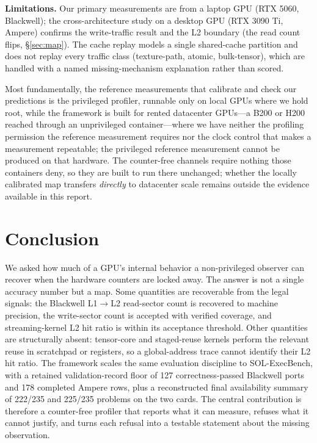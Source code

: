 \documentclass[conference]{IEEEtran}
\begin{document}
\textbf{Limitations.} Our primary measurements are from a laptop GPU (RTX 5060,
Blackwell); the cross-architecture study on a desktop GPU (RTX 3090 Ti, Ampere)
confirms the write-traffic result and the L2 boundary (the read
count flips, \S\ref{sec:map}). The cache replay models a single shared-cache partition and
does not replay every traffic class (texture-path, atomic, bulk-tensor), which are
handled with a named missing-mechanism explanation rather than scored.

Most fundamentally, the reference measurements that calibrate and check our predictions
is the privileged profiler, runnable only on local GPUs where we hold root,
while the framework is built for rented datacenter GPUs---a B200 or H200
reached through an unprivileged container---where we have neither the profiling
permission the reference measurement requires nor the clock control that makes a
measurement repeatable; the privileged reference measurement cannot be produced on that
hardware. The
counter-free channels require nothing those containers deny, so they are
built to run there unchanged; whether the locally calibrated map transfers
\emph{directly} to datacenter scale remains outside the evidence available
in this report.

\section{Conclusion}
We asked how much of a GPU's internal behavior a non-privileged observer can
recover when the hardware counters are locked away. The answer is not a
single accuracy number but a map. Some quantities are recoverable from the
legal signals: the Blackwell L1$\rightarrow$L2 read-sector count is recovered
to machine precision, the write-sector count is accepted with verified
coverage, and streaming-kernel L2 hit ratio is within its acceptance threshold. Other
quantities are structurally absent: tensor-core and staged-reuse kernels
perform the relevant reuse in scratchpad or registers, so a global-address
trace cannot identify their L2 hit ratio. The framework scales the same
evaluation discipline to SOL-ExecBench, with a retained validation-record floor of
127 correctness-passed Blackwell ports and 178 completed Ampere rows, plus a
reconstructed final availability summary of 222/235 and 225/235 problems on
the two cards. The central contribution is therefore a counter-free profiler
that reports what it can measure, refuses what it cannot justify, and turns
each refusal into a testable statement about the missing observation.



\end{document}
